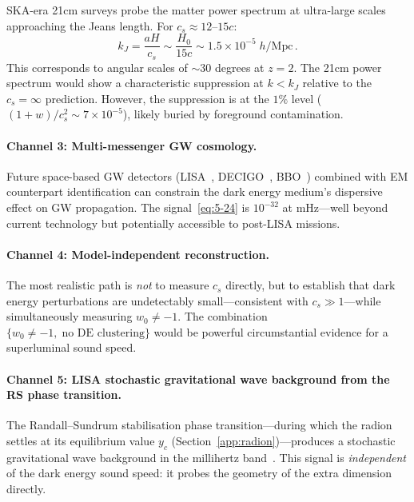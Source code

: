 SKA-era 21cm surveys probe the matter power spectrum at ultra-large scales approaching the Jeans length. For $c_s \approx 12$--$15c$:
\begin{equation}
  k_J = \frac{aH}{c_s} \sim \frac{H_0}{15c} \sim 1.5 \times 10^{-5}\;h/\mathrm{Mpc}\,.
  \label{eq:5-29}
\end{equation}
This corresponds to angular scales of ${\sim}30$ degrees at $z = 2$. The 21cm power spectrum would show a characteristic suppression at $k < k_J$ relative to the $c_s = \infty$ prediction. However, the suppression is at the $1\%$ level ($(1+w)/c_s^2 \sim 7 \times 10^{-5}$), likely buried by foreground contamination.

\paragraph{Channel 3: Multi-messenger GW cosmology.}

Future space-based GW detectors (LISA~\cite{ch5:LISA}, DECIGO~\cite{ch5:DECIGO}, BBO~\cite{ch5:BBO}) combined with EM counterpart identification can constrain the dark energy medium's dispersive effect on GW propagation. The signal~\eqref{eq:5-24} is $10^{-32}$ at mHz---well beyond current technology but potentially accessible to post-LISA missions.

\paragraph{Channel 4: Model-independent reconstruction.}

The most realistic path is \emph{not} to measure $c_s$ directly, but to establish that dark energy perturbations are undetectably small---consistent with $c_s \gg 1$---while simultaneously measuring $w_0 \neq -1$. The combination $\{w_0 \neq -1,\;\text{no DE clustering}\}$ would be powerful circumstantial evidence for a superluminal sound speed.

\paragraph{Channel 5: LISA stochastic gravitational wave background from the RS phase transition.}

The Randall--Sundrum stabilisation phase transition---during which the radion settles at its equilibrium value $y_c$ (Section~\ref{app:radion})---produces a stochastic gravitational wave background in the millihertz band~\cite{ch5:Caprini2016,ch5:Caprini2020}. This signal is \emph{independent} of the dark energy sound speed: it probes the geometry of the extra dimension directly.

